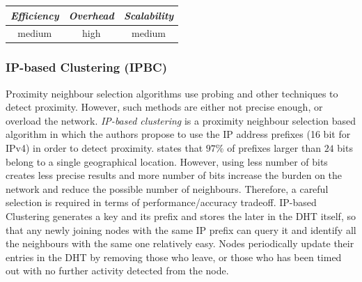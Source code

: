 %
%
%

\begin{center}
\begin{tabular}{ccc}
\emph{Efficiency} & \emph{Overhead} & \emph{Scalability} \\
\hline
medium &
high &
medium
\end{tabular}
\end{center}

\subsubsection{IP-based Clustering (IPBC)}
Proximity neighbour selection algorithms use probing and other techniques to
detect proximity. However, such methods are either not precise enough, or
overload the network. \emph{IP-based clustering} \cite{karwaczynski_ipbc_2007}
is a proximity neighbour selection based algorithm in which the authors propose
to use the IP address prefixes (16 bit for IPv4) in order to detect proximity.
\cite{freedman_iploc_2005} states that $97\%$ of prefixes larger than $24$ bits
belong to a single geographical location. However, using less number of bits
creates less precise results and more number of bits increase the burden on the
network and reduce the possible number of neighbours. Therefore, a careful
selection is required in terms of performance/accuracy tradeoff. IP-based
Clustering generates a key and its prefix and stores the later in the DHT
itself, so that any newly joining nodes with the same IP prefix can query it and
identify all the neighbours with the same one relatively easy. Nodes
periodically update their entries in the DHT by removing those who leave, or
those who has been timed out with no further activity detected from the node.

